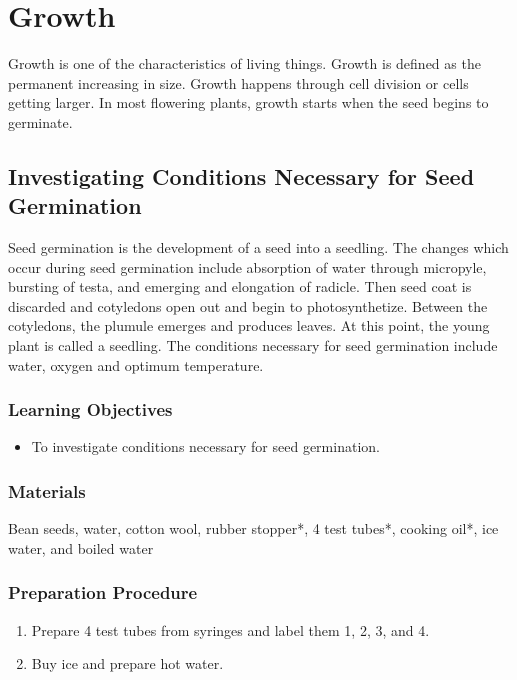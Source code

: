 \section{Growth}
Growth is one of the characteristics of living things. Growth is defined as the permanent increasing in size. Growth happens through cell division or cells getting larger. In most flowering plants, growth starts when the seed begins to germinate.

\subsection{Investigating Conditions Necessary for Seed Germination}
Seed germination is the development of a seed into a seedling. The changes which occur during seed germination include absorption of water through micropyle, bursting of testa, and emerging and elongation of radicle. Then seed coat is discarded and cotyledons open out and begin to photosynthetize. Between the cotyledons, the plumule emerges and produces leaves. At this point, the young plant is called a seedling. The conditions necessary for seed germination include water, oxygen and optimum temperature.

\subsubsection*{Learning Objectives}
\begin{itemize}
\item{To investigate conditions necessary for seed germination.}
\end{itemize}

\subsubsection*{Materials}
Bean seeds, water, cotton wool, rubber stopper*, 4 test tubes*, cooking oil*, ice water, and boiled water

\subsubsection*{Preparation Procedure}
\begin{enumerate}
\item{Prepare 4 test tubes from syringes and label them 1, 2, 3, and 4.}
\item{Buy ice and prepare hot water.}
\end{enumerate}


